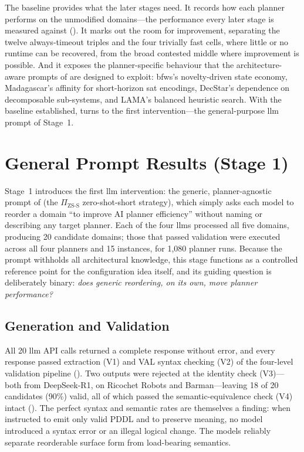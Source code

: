 The baseline provides what the later stages need.
It records how each planner performs on the unmodified domains---the performance every later stage is measured against ().
It marks out the room for improvement, separating the twelve always-timeout triples and the four trivially fast cells, where little or no runtime can be recovered, from the broad contested middle where improvement is possible.
And it exposes the planner-specific behaviour that the architecture-aware prompts of  are designed to exploit: \gls{bfws}'s novelty-driven state economy, Madagascar's affinity for short-horizon \gls{sat} encodings, DecStar's dependence on decomposable sub-systems, and LAMA's balanced heuristic search.
With the baseline established,  turns to the first intervention---the general-purpose \gls{llm} prompt of Stage~1.

\section{General Prompt Results (Stage 1)}
\label{sec:results:stage1}

Stage~1 introduces the first \gls{llm} intervention: the generic, planner-agnostic prompt of  (the $\Pi_\text{ZS-S}$ zero-shot-short strategy), which simply asks each model to reorder a domain ``to improve AI planner efficiency'' without naming or describing any target planner.
Each of the four \glspl{llm} processed all five domains, producing 20 candidate domains; those that passed validation were executed across all four planners and 15 instances, for 1{,}080 planner runs.
Because the prompt withholds all architectural knowledge, this stage functions as a controlled reference point for the configuration idea itself, and its guiding question is deliberately binary: \emph{does generic reordering, on its own, move planner performance?}

\subsection{Generation and Validation}
\label{sec:results:stage1:generation}

All 20 \gls{llm} API calls returned a complete response without error, and every response passed extraction (V1) and VAL syntax checking (V2) of the four-level validation pipeline ().
Two outputs were rejected at the identity check (V3)---both from DeepSeek-R1, on Ricochet Robots and Barman---leaving 18 of 20 candidates (90\%) valid, all of which passed the semantic-equivalence check (V4) intact ().
The perfect syntax and semantic rates are themselves a finding: when instructed to emit only valid PDDL and to preserve meaning, no model introduced a syntax error or an illegal logical change. The models reliably separate reorderable surface form from load-bearing semantics.

